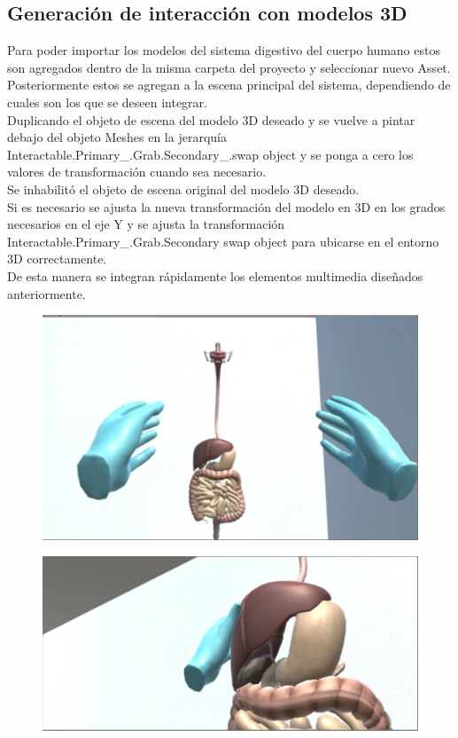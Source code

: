 \subsection{Generación de interacción con modelos 3D}
Para poder importar los modelos del sistema digestivo del cuerpo humano estos son agregados dentro de la misma carpeta del proyecto y seleccionar nuevo Asset.\\
Posteriormente estos se agregan a la escena principal del sistema, dependiendo de cuales son los que se deseen integrar.\\
Duplicando el objeto de escena del modelo 3D deseado y  se vuelve a pintar debajo del objeto Meshes en la jerarquía Interactable.Primary\_.Grab.Secondary\_.swap object y 
se ponga a cero los valores de transformación cuando sea necesario.\\
Se inhabilitó el objeto de escena original del modelo 3D deseado.\\
Si es necesario se ajusta la nueva transformación del modelo en 3D en los grados necesarios en el eje Y y se ajusta la transformación Interactable.Primary\_.Grab.Secondary 
swap object para ubicarse en el entorno 3D correctamente.\\
De esta manera se integran rápidamente los elementos multimedia diseñados anteriormente.\\
\begin{figure}[H]
	\begin{center}
 		\includegraphics[width = .5\textwidth]{source/images/image37.png}
	\end{center} 
\end{figure}
\begin{figure}[H]
	\begin{center}
 		\includegraphics[width = .5\textwidth]{source/images/image67.png}
	\end{center} 
\end{figure}